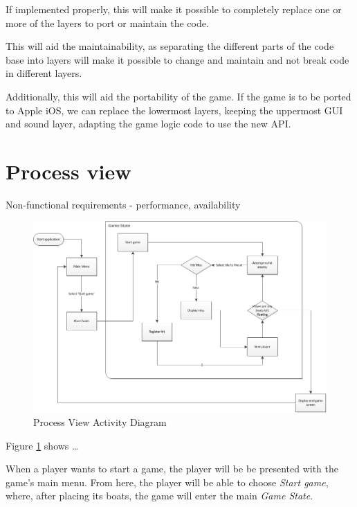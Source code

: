 If implemented properly, this will make it possible to completely replace one or more of the layers to port or maintain the code.


This will aid the maintainability, as separating the different parts of the code base into layers will make it possible to change and maintain and not break code in different layers.

Additionally, this will aid the portability of the game. If the game is to be ported to Apple iOS, we can replace the lowermost layers, keeping the uppermost GUI and sound layer, adapting the game logic code to use the new API.






\section{Process view}
Non-functional requirements - performance, availability
    
\begin{figure}[ht]
    \includegraphics[angle=90, scale=0.8]{ProcessLayer.png}
    \caption{Process View Activity Diagram}
    \label{fig:ActivityDiagram}
\end{figure}

Figure \ref{fig:ActivityDiagram} shows …

When a player wants to start a game, the player will be be presented with the game's main menu. From here, the player will be able to choose \emph{Start game}, where, after placing its boats, the game will enter the main \emph{Game State}.

